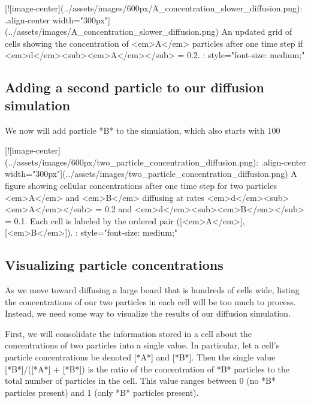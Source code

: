 {{{{{{{{{[![image-center](../assets/images/600px/A_concentration_slower_diffusion.png){: .align-center width="300px"}](../assets/images/A_concentration_slower_diffusion.png)
An updated grid of cells showing the concentration of <em>A</em> particles after one time step if <em>d</em><sub><em>A</em></sub> = 0.2.
{: style="font-size: medium;"}

\FloatBarrier
{}
\subsection{Adding a second particle to our diffusion simulation}

We now will add particle *B* to the simulation, which also starts with 100%

[![image-center](../assets/images/600px/two_particle_concentration_diffusion.png){: .align-center width="300px"}](../assets/images/two_particle_concentration_diffusion.png)
A figure showing cellular concentrations after one time step for two particles <em>A</em> and <em>B</em> diffusing at rates <em>d</em><sub><em>A</em></sub> = 0.2 and <em>d</em><sub><em>B</em></sub> = 0.1. Each cell is labeled by the ordered pair ([<em>A</em>], [<em>B</em>]).
{: style="font-size: medium;"}

\begin{qbox}[%
Update the cells in the above figure after another generation of diffusion. Use the diffusion rates <em>d</em><sub><em>A</em></sub> = 0.2 and <em>d</em><sub><em>B</em></sub> = 0.1.
]\end{qbox}

\FloatBarrier
{}
\subsection{Visualizing particle concentrations}

As we move toward diffusing a large board that is hundreds of cells wide, listing the concentrations of our two particles in each cell will be too much to process. Instead, we need some way to visualize the results of our diffusion simulation.

First, we will consolidate the information stored in a cell about the concentrations of two particles into a single value. In particular, let a cell's particle concentrations be denoted [*A*] and [*B*]. Then the single value [*B*]/([*A*] + [*B*]) is the ratio of the concentration of *B* particles to the total number of particles in the cell. This value ranges between 0 (no *B* particles present) and 1 (only *B* particles present).

}}}}}}}}}
